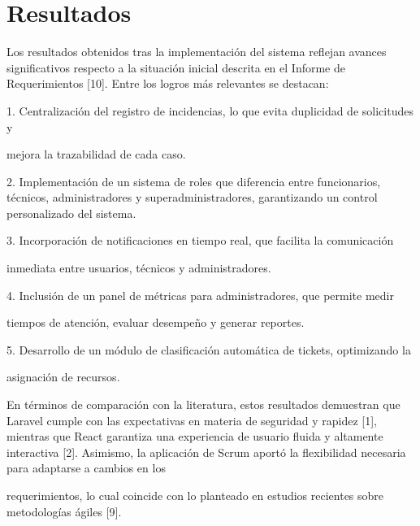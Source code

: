 \section{Resultados}
Los resultados obtenidos tras la implementación del sistema reflejan avances 
significativos respecto a la situación inicial descrita en el Informe de Requerimientos 
[10]. Entre los logros más relevantes se destacan: 

1.  Centralización del registro de incidencias, lo que evita duplicidad de solicitudes y 

mejora la trazabilidad de cada caso. 

2.  Implementación de un sistema de roles que diferencia entre funcionarios, 
técnicos, administradores y superadministradores, garantizando un control 
personalizado del sistema. 

3.  Incorporación de notificaciones en tiempo real, que facilita la comunicación 

inmediata entre usuarios, técnicos y administradores. 

4.  Inclusión de un panel de métricas para administradores, que permite medir 

tiempos de atención, evaluar desempeño y generar reportes. 

5.  Desarrollo de un módulo de clasificación automática de tickets, optimizando la 

asignación de recursos. 

En términos de comparación con la literatura, estos resultados demuestran que Laravel 
cumple con las expectativas en materia de seguridad y rapidez [1], mientras que React 
garantiza una experiencia de usuario fluida y altamente interactiva [2]. Asimismo, la 
aplicación de Scrum aportó la flexibilidad necesaria para adaptarse a cambios en los 

requerimientos, lo cual coincide con lo planteado en estudios recientes sobre 
metodologías ágiles [9]. 